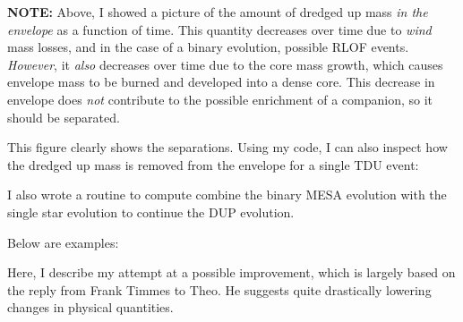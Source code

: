 \documentclass[a4paper,10pt]{article}
\begin{document}
\begin{figure}[ht]
    \centering
\end{figure}

\begin{questionbox}{}{}
\textbf{\textcolor{keywordscolor}{NOTE:}}
    Above, I showed a picture of the amount of dredged up mass \emph{in the envelope} as a function of time. This quantity decreases over time due to \emph{wind} mass losses, and in the case of a binary evolution, possible RLOF events. \emph{However}, it \emph{also} decreases over time due to the core mass growth, which causes envelope mass to be burned and developed into a dense core. This decrease in envelope does \emph{not} contribute to the possible enrichment of a companion, so it should be separated.
\end{questionbox}


\begin{figure}[ht]
    \centering
\end{figure}

This figure clearly shows the separations. Using my code, I can also inspect how the dredged up mass is removed from the envelope for a single TDU event:

\begin{figure}[ht]
    \centering
\end{figure}

I also wrote a routine to compute combine the binary MESA evolution with the single star evolution to continue the DUP evolution.

Below are examples:
\begin{figure}[ht]
    \centering
\end{figure}

\begin{figure}[ht]
    \centering
\end{figure}




Here, I describe my attempt at a possible improvement, which is largely based on the reply from Frank Timmes to Theo. He suggests quite drastically lowering changes in physical quantities.
\end{document}
